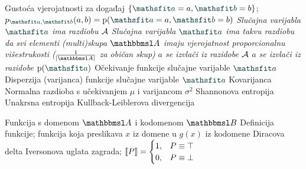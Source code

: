  {Gustoća vjerojatnosti za događaj $\cbr{\rvar a= a,\rvar b= b}$; $p_{\rvar a,\rvar b}(a,b)=\p(\rvar a= a,\rvar b= b)$}
 {\textit{Slučajna varijabla $\rvar a$ ima razdiobu $\mathcal{A}$}}
 	{\textit{Slučajna varijabla $\rvar a$ ima takvu razdiobu da svi elementi (multi)skupa $\set A$ imaju vjerojatnost proporcionalnu višestrukosti ($\frac{1}{\envert{\set A}}$ za običan skup)}}
 {\textit{$a$ se izvlači iz razidobe $\mathcal{A}$}}
 {\textit{$a$ se izvlači iz razidobe $\p(\rvar a)$}}
 {Očekivanje funkcije slučajne varijable $\rvar a$}
 {Disperzija (varijanca) funkcije slučajne varijable $\rvar a$}
		{Kovarijanca}
 {Normalna razdioba s učekivanjem $\mu$ i varijancom $\sigma^2$}
			{Shannonova entropija}
 {Unakrsna entropija}
		{Kullback-Leiblerova divergencija}

 {Funkcija s domenom $\set A$ i kodomenom $\set B$}
 {Definicija funkcije; funkcija koja preslikava $x$ iz domene u $g(x)$ iz kodomene}
	{Diracova delta}
 {Iversonova uglata zagrada; $\enbbracket{P}=\begin{cases} 1, & P \equiv \top \\ 0, & P \equiv \bot \end{cases}$}

